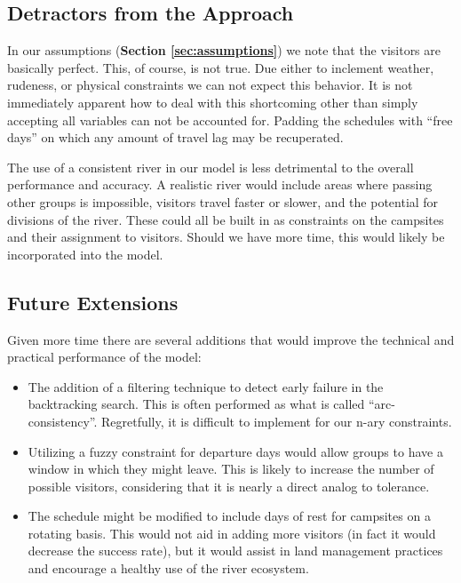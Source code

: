 \documentclass[11pt]{article} %
\begin{document}
\subsection{Detractors from the Approach}
\label{sec:cons}
In our assumptions (\textbf{Section \ref{sec:assumptions}}) we note that the
visitors are basically perfect.  This, of course, is not true.  Due either to 
inclement weather, rudeness, or physical constraints we can not expect this 
behavior.  It is not immediately apparent
how to deal with this shortcoming other than simply accepting all variables 
can not be accounted for.  Padding the schedules with ``free days'' on
which any amount of travel lag may be recuperated.

The use of a consistent river in our model is less detrimental to the
overall performance and accuracy.  A realistic river would include areas
where passing other groups is impossible, visitors travel faster or slower,
and the potential for divisions of the river.  These could all be built in
as constraints on the campsites and their assignment to visitors.  Should
we have more time, this would likely be incorporated into the model.


\subsection{Future Extensions}
\label{sec:extensions}
Given more time there are several additions that would improve the technical
and practical performance of the model:
\begin{itemize}
\item The addition of a filtering technique to detect early failure in the
backtracking search.  This is often performed as what is called
``arc-consistency''.  Regretfully, it is difficult to implement for our
n-ary constraints.
\item Utilizing a fuzzy constraint for departure days would allow groups
to have a window in which they might leave.  This is likely to increase the
number of possible visitors, considering that it is nearly a direct analog
to tolerance.
\item The schedule might be modified to include days of rest for campsites
on a rotating basis.  This would not aid in adding more visitors (in fact it
would decrease the success rate), but it would assist in land management
practices and encourage a healthy use of the river ecosystem.
\end{itemize}
\end{document}
